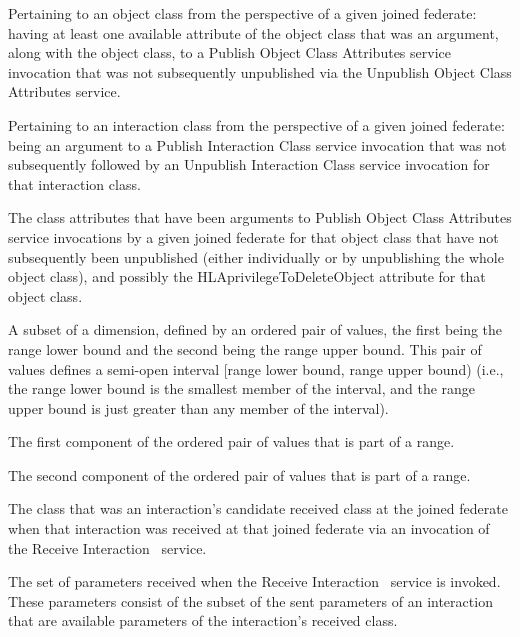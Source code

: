 \begin{stdalphalist}
    \item Pertaining to an object class from the perspective of a given joined federate: having at least one available attribute of the object class that was an argument, along with the object class, to a Publish Object Class Attributes service invocation that was not subsequently unpublished via the Unpublish Object Class Attributes service.
    \item Pertaining to an interaction class from the perspective of a given joined federate: being an argument to a Publish Interaction Class service invocation that was not subsequently followed by an Unpublish Interaction Class service invocation for that interaction class.
\end{stdalphalist}

 The class attributes that have been arguments to Publish Object Class Attributes service invocations by a given joined federate for that object class that have not subsequently been unpublished (either individually or by unpublishing the whole object class), and possibly the HLAprivilegeToDeleteObject attribute for that object class.

 A subset of a dimension, defined by an ordered pair of values, the first being the range lower bound and the second being the range upper bound. This pair of values defines a semi-open interval [range lower bound, range upper bound) (i.e., the range lower bound is the smallest member of the interval, and the range upper bound is just greater than any member of the interval).

 The first component of the ordered pair of values that is part of a range.

 The second component of the ordered pair of values that is part of a range.

\clearpage
{} The class that was an interaction's candidate received class at the joined federate when that interaction was received at that joined federate via an invocation of the Receive Interaction \rtiinitiated\ service.

 The set of parameters received when the Receive Interaction \rtiinitiated\ service is invoked. These parameters consist of the subset of the sent parameters of an interaction that are available parameters of the interaction's received class.

